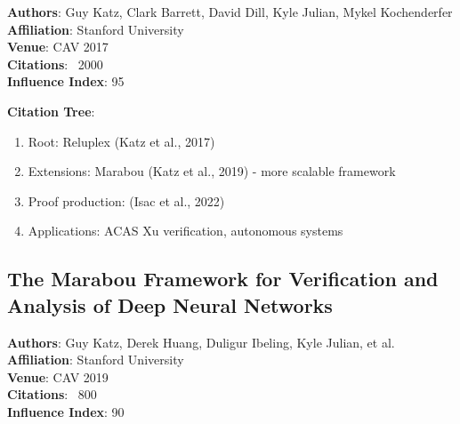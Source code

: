\documentclass[12pt,a4paper]{article}
\begin{document}
\textbf{Authors}: Guy Katz, Clark Barrett, David Dill, Kyle Julian, Mykel Kochenderfer \\
\textbf{Affiliation}: Stanford University \\
\textbf{Venue}: CAV 2017 \\
\textbf{Citations}: ~2000 \\
\textbf{Influence Index}: 95

\begin{abstract}
Reluplex presents a novel, scalable, and efficient technique for verifying properties of deep neural networks (or providing counter-examples). The technique extends the simplex method to handle the non-convex Rectified Linear Unit (ReLU) activation function. Evaluated on a prototype neural network implementation of the ACAS Xu collision avoidance system, Reluplex successfully proved properties of networks with much larger scale than previously possible.
\end{abstract}

\textbf{Citation Tree}:
\begin{enumerate}
    \item Root: Reluplex (Katz et al., 2017)
    \item Extensions: Marabou (Katz et al., 2019) - more scalable framework
    \item Proof production: (Isac et al., 2022)
    \item Applications: ACAS Xu verification, autonomous systems
\end{enumerate}

\subsection{The Marabou Framework for Verification and Analysis of Deep Neural Networks}

\textbf{Authors}: Guy Katz, Derek Huang, Duligur Ibeling, Kyle Julian, et al. \\
\textbf{Affiliation}: Stanford University \\
\textbf{Venue}: CAV 2019 \\
\textbf{Citations}: ~800 \\
\textbf{Influence Index}: 90

\begin{abstract}
Marabou is an SMT-based tool that can answer queries about a network's behavior. It can check whether the network violates specifications, find concrete counterexamples, and compute networks with optimized parameters. Marabou combines symbolic interval propagation with SAT/SMT solvers.
\end{abstract}
\end{document}

